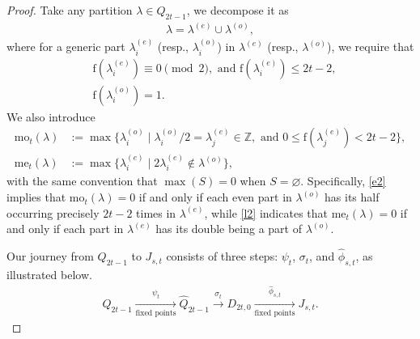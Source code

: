 \documentclass[12pt,reqno]{amsart}
\numberwithin{equation}{section}
\newcommand{\f}{\mathrm{f}}
\def\bZ{\mathbb{Z}}
\def\mo{\mathrm{mo}}
\def\me{\mathrm{me}}
\begin{document}
\begin{proof}
	Take any partition $\lambda\in Q_{2t-1}$, we decompose it as
	\begin{align*}
		\lambda=\lambda^{(e)}\cup\lambda^{(o)},
	\end{align*}
	where for a generic part $\lambda^{(e)}_i$ (resp., $\lambda^{(o)}_i$) in $\lambda^{(e)}$ (resp., $\lambda^{(o)}$), we require that
	\begin{align*}
		&\f(\lambda^{(e)}_i) \equiv 0 \pmod{2}, \text{ and }\f(\lambda^{(e)}_i) \leq 2t-2,\\
		&\f(\lambda^{(o)}_i) =1.
	\end{align*}
	We also introduce
	\begin{align}
		\mo_{t}(\lambda) &:= \max\{\lambda^{(o)}_i\mid\lambda^{(o)}_i/2= \lambda^{(e)}_j\in \bZ,\text{ and }0\le \f(\lambda^{(e)}_j)<2t-2\},\label{e2} \\
		\me_{t}(\lambda) &:= \max\{\lambda^{(e)}_i\mid 2\lambda^{(e)}_i\not\in \lambda^{(o)} \},\label{l2}
	\end{align}
	with the same convention that $\max(S)=0$ when $S=\varnothing$. Specifically, \eqref{e2} implies that $\mo_t(\lambda)=0$ if and only if each even part in $\lambda^{(o)}$ has its half occurring precisely $2t-2$ times in $\lambda^{(e)}$, while \eqref{l2} indicates that $\me_t(\lambda)=0$ if and only if each part in $\lambda^{(e)}$ has its double being a part of $\lambda^{(o)}$. 

  Our journey from $Q_{2t-1}$ to $J_{s,t}$ consists of three steps: $\psi_t$, $\sigma_t$, and $\hat{\phi}_{s,t}$, as illustrated below.
  \begin{align*}
  Q_{2t-1} \xrightarrow[\text{fixed points}]{\text{$\psi_t$}} \hat{Q}_{2t-1} \xrightarrow[]{\text{$\sigma_t$}} D_{2t,0} \xrightarrow[\text{fixed points}]{\text{$\hat{\phi}_{s,t}$}} J_{s,t}.
  \end{align*}









































\end{proof}
\end{document}
